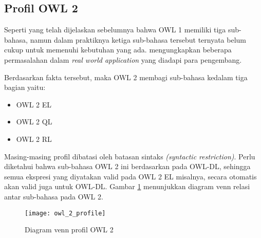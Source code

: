 \subsection{Profil OWL 2}
Seperti yang telah dijelaskan sebelumnya bahwa OWL 1 memiliki tiga sub-bahasa, namun dalam praktiknya ketiga sub-bahasa tersebut ternyata belum cukup untuk memenuhi kebutuhan yang ada. \citet{patel} mengungkapkan beberapa permasalahan dalam \emph{real world application} yang diadapi para pengembang.

Berdasarkan fakta tersebut, maka OWL 2 membagi sub-bahasa kedalam tiga bagian yaitu:
\begin{itemize}
	\item OWL 2 EL
	\item OWL 2 QL
	\item OWL 2 RL
\end{itemize}

Masing-masing profil dibatasi oleh batasan sintaks \emph{(syntactic restriction)}. Perlu diketahui bahwa sub-bahasa OWL 2 ini berdasarkan pada OWL-DL, sehingga semua ekspresi yang diyatakan valid pada OWL 2 EL misalnya, secara otomatis akan valid juga untuk OWL-DL. Gambar \ref{fig:owl_2_profile} menunjukkan diagram venn relasi antar sub-bahasa pada OWL 2.

\begin{figure}[ht]
	\centering
	\texttt{[image: owl\_2\_profile]}
	\caption{Diagram venn profil OWL 2}
	\label{fig:owl_2_profile}
\end{figure}